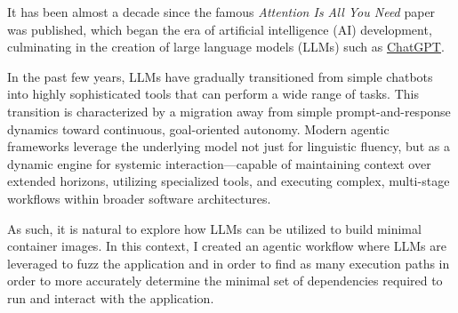 
It has been almost a decade since the famous \textit{Attention Is All You Need} \cite{attention} paper was
published, which began the era of artificial intelligence (AI) development, culminating in the creation
of large language models (LLMs) such as \href{https://chat.openai.com/}{ChatGPT}.

In the past few years, LLMs have gradually transitioned from simple chatbots into highly sophisticated
tools that can perform a wide range of tasks. This transition is characterized 
by a migration away from simple prompt-and-response dynamics toward continuous, goal-oriented autonomy. 
Modern agentic frameworks leverage the underlying model not just for linguistic fluency, but as a 
dynamic engine for systemic interaction—capable of maintaining context over extended horizons, 
utilizing specialized tools, and executing complex, multi-stage workflows within broader software architectures.

As such, it is natural to explore how LLMs can be utilized to build minimal container images. In this context, 
I created an agentic workflow where LLMs are leveraged to fuzz the application and in order to find as many 
execution paths in order to more accurately determine the minimal set of dependencies required to run and interact with
the application.